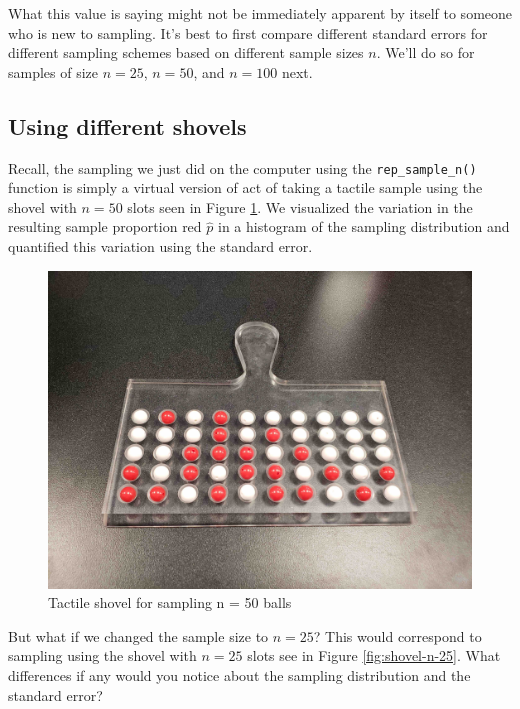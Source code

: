 \documentclass[12pt,]{krantz}
\theoremstyle{definition}
\theoremstyle{definition}
\theoremstyle{definition}
\theoremstyle{remark}
\begin{document}
What this value is saying might not be immediately apparent by itself to
someone who is new to sampling. It's best to first compare different
standard errors for different sampling schemes based on different sample
sizes \(n\). We'll do so for samples of size \(n=25\), \(n=50\), and
\(n=100\) next.

\subsection{Using different shovels}\label{using-different-shovels}

Recall, the sampling we just did on the computer using the
\texttt{rep\_sample\_n()} function is simply a virtual version of act of
taking a tactile sample using the shovel with \(n=50\) slots seen in
Figure \ref{fig:shovel-n-50}. We visualized the variation in the
resulting sample proportion red \(\widehat{p}\) in a histogram of the
sampling distribution and quantified this variation using the standard
error.

\begin{figure}

{\centering \includegraphics[width=0.8\linewidth]{images/sampling/shovel_050} 

}

\caption{Tactile shovel for sampling n = 50 balls}\label{fig:shovel-n-50}
\end{figure}

But what if we changed the sample size to \(n=25\)? This would
correspond to sampling using the shovel with \(n=25\) slots see in
Figure \ref{fig:shovel-n-25}. What differences if any would you notice
about the sampling distribution and the standard error?
\end{document}
